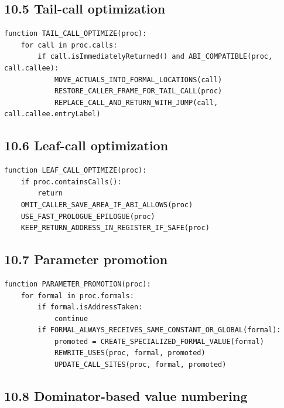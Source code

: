 \documentclass[10pt,letterpaper]{article}
\begin{document}
\subsection*{10.5 Tail-call optimization}

\begin{verbatim}
function TAIL_CALL_OPTIMIZE(proc):
    for call in proc.calls:
        if call.isImmediatelyReturned() and ABI_COMPATIBLE(proc, call.callee):
            MOVE_ACTUALS_INTO_FORMAL_LOCATIONS(call)
            RESTORE_CALLER_FRAME_FOR_TAIL_CALL(proc)
            REPLACE_CALL_AND_RETURN_WITH_JUMP(call, call.callee.entryLabel)
\end{verbatim}

\subsection*{10.6 Leaf-call optimization}

\begin{verbatim}
function LEAF_CALL_OPTIMIZE(proc):
    if proc.containsCalls():
        return
    OMIT_CALLER_SAVE_AREA_IF_ABI_ALLOWS(proc)
    USE_FAST_PROLOGUE_EPILOGUE(proc)
    KEEP_RETURN_ADDRESS_IN_REGISTER_IF_SAFE(proc)
\end{verbatim}

\subsection*{10.7 Parameter promotion}

\begin{verbatim}
function PARAMETER_PROMOTION(proc):
    for formal in proc.formals:
        if formal.isAddressTaken:
            continue
        if FORMAL_ALWAYS_RECEIVES_SAME_CONSTANT_OR_GLOBAL(formal):
            promoted = CREATE_SPECIALIZED_FORMAL_VALUE(formal)
            REWRITE_USES(proc, formal, promoted)
            UPDATE_CALL_SITES(proc, formal, promoted)
\end{verbatim}

\subsection*{10.8 Dominator-based value numbering}
\end{document}
